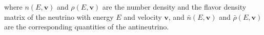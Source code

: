 where $n(E,\mathbf v)$ and $\rho(E, \mathbf v)$ are the number density and the flavor density matrix of the neutrino with energy $E$ and velocity $\mathbf v$, and $\bar n(E, \mathbf v)$ and $\bar \rho(E,\mathbf v)$ are the corresponding quantities of the antineutrino.

